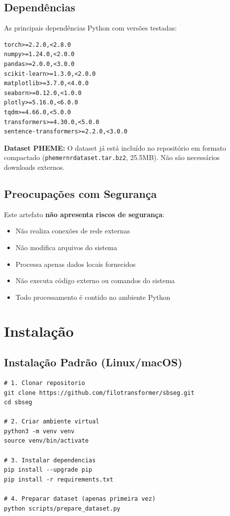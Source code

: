 \documentclass[12pt]{article}
\begin{document}
\subsection{Depend\^encias}

As principais depend\^encias Python com vers\~oes testadas:

\begin{verbatim}
torch>=2.2.0,<2.8.0
numpy>=1.24.0,<2.0.0
pandas>=2.0.0,<3.0.0
scikit-learn>=1.3.0,<2.0.0
matplotlib>=3.7.0,<4.0.0
seaborn>=0.12.0,<1.0.0
plotly>=5.16.0,<6.0.0
tqdm>=4.66.0,<5.0.0
transformers>=4.30.0,<5.0.0
sentence-transformers>=2.2.0,<3.0.0
\end{verbatim}

\textbf{Dataset PHEME:} O dataset j\'a est\'a inclu\'ido no reposit\'orio em formato compactado (\texttt{phemernrdataset.tar.bz2}, 25.5MB). N\~ao s\~ao necess\'arios downloads externos.

\subsection{Preocupa\c{c}\~oes com Seguran\c{c}a}

Este artefato \textbf{n\~ao apresenta riscos de seguran\c{c}a}:
\begin{itemize}
    \item N\~ao realiza conex\~oes de rede externas
    \item N\~ao modifica arquivos do sistema
    \item Processa apenas dados locais fornecidos
    \item N\~ao executa c\'odigo externo ou comandos do sistema
    \item Todo processamento \'e contido no ambiente Python
\end{itemize}

\section{Instala\c{c}\~ao}

\subsection{Instala\c{c}\~ao Padr\~ao (Linux/macOS)}

\begin{verbatim}
# 1. Clonar repositorio
git clone https://github.com/filotransformer/sbseg.git
cd sbseg

# 2. Criar ambiente virtual
python3 -m venv venv
source venv/bin/activate

# 3. Instalar dependencias
pip install --upgrade pip
pip install -r requirements.txt

# 4. Preparar dataset (apenas primeira vez)
python scripts/prepare_dataset.py
\end{verbatim}
\end{document}
